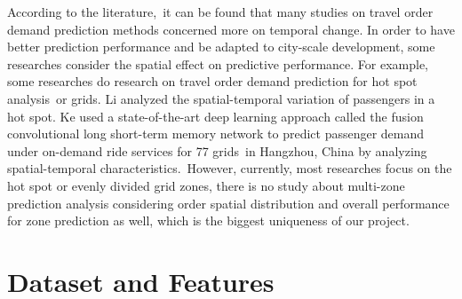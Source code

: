 \documentclass[sigconf]{acmart}
\begin{document}
According to the literature, it can be found that many studies on travel order demand prediction methods 
concerned more on temporal change. In order to have better prediction performance and be adapted to city-scale development, 
some researches consider the spatial effect on predictive performance. For example, some researches do research on travel 
order demand prediction for hot spot analysis or grids. Li\cite{li2012prediction} analyzed the spatial-temporal variation of passengers
in a hot spot. Ke\cite{ke2017short} used a state-of-the-art deep learning approach called the fusion convolutional long short-term 
memory network to predict passenger demand under on-demand ride services for 77 grids in Hangzhou, China by analyzing spatial-temporal
characteristics. However, currently, most researches focus on the hot spot or evenly divided grid zones, there is no study about multi-zone
prediction analysis considering order spatial distribution and overall performance for zone prediction as well, which is the biggest uniqueness of our project. 


\section{Dataset and Features}
\end{document}
